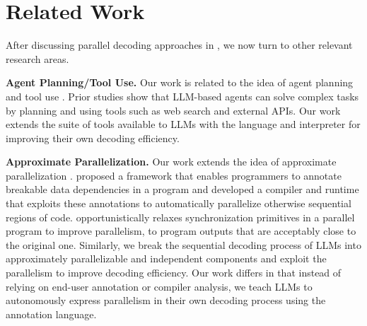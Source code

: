 \section{Related Work}
After discussing parallel decoding approaches in , we now turn to other relevant research areas.




\textbf{Agent Planning/Tool Use.}
Our work is related to the idea of agent planning and tool use \citep{yao2023react, schick2023toolformer, shen2023hugginggpt, liang2023taskmatrixai, lu2023chameleon}.
Prior studies show that LLM-based agents can solve complex tasks by planning and using tools such as web search and external APIs.
Our work extends the suite of tools available to LLMs with the \lang{} language and interpreter for improving their own decoding efficiency.

\textbf{Approximate Parallelization.}
Our work extends the idea of approximate parallelization \citep{10.1145/1993498.1993555, 10.1145/2414729.2414738}.
\citet{10.1145/1993498.1993555} proposed a framework that enables programmers to annotate breakable data dependencies in a program and 
developed a compiler and runtime that exploits these annotations to automatically parallelize otherwise sequential regions of code.
\citet{10.1145/2414729.2414738} opportunistically relaxes synchronization primitives in a parallel program to improve parallelism, to program outputs that are acceptably close to the original one.
Similarly, we break the sequential decoding process of LLMs into approximately parallelizable and independent components and exploit the parallelism to improve decoding efficiency.
Our work differs in that instead of relying on end-user annotation or compiler analysis, we teach LLMs to autonomously express parallelism in their own decoding process using the \lang{} annotation language.


\vspace{-.5em}